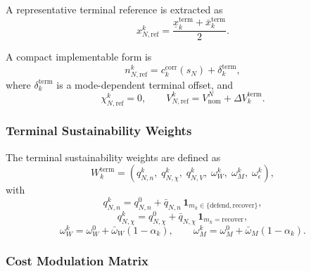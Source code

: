 \documentclass[final ,3p, times]{elsarticle}
\begin{document}
A representative terminal reference is extracted as
\begin{equation}
x_{N,\mathrm{ref}}^k
=
\frac{
\underline x_k^{\mathrm{term}}
+
\bar x_k^{\mathrm{term}}
}{2}.
\label{eq:terminal_reference_center}
\end{equation}

A compact implementable form is
\begin{equation}
n_{N,\mathrm{ref}}^k
=
c_k^{\mathrm{corr}}(s_N)
+
\delta_k^{\mathrm{term}},
\label{eq:terminal_n_reference}
\end{equation}
where $\delta_k^{\mathrm{term}}$ is a mode-dependent terminal offset, and
\begin{equation}
\chi_{N,\mathrm{ref}}^k = 0,
\qquad
V_{N,\mathrm{ref}}^k
=
V_{\mathrm{nom}}^N + \Delta V_k^{\mathrm{term}}.
\label{eq:terminal_chi_v_reference}
\end{equation}

\subsubsection{Terminal Sustainability Weights}

The terminal sustainability weights are defined as
\begin{equation}
W_k^{\mathrm{term}}
=
\left(
q_{N,n}^k,\;
q_{N,\chi}^k,\;
q_{N,V}^k,\;
\omega_{W}^k,\;
\omega_{M}^k,\;
\omega_{\epsilon}^k
\right),
\label{eq:terminal_weight_vector}
\end{equation}
with
\begin{equation}
q_{N,n}^k = q_{N,n}^{0} + \bar q_{N,n}\,\mathbf{1}_{m_k \in \{\mathrm{defend},\mathrm{recover}\}},
\label{eq:terminal_weight_n}
\end{equation}
\begin{equation}
q_{N,\chi}^k = q_{N,\chi}^{0} + \bar q_{N,\chi}\,\mathbf{1}_{m_k=\mathrm{recover}},
\label{eq:terminal_weight_chi}
\end{equation}
\begin{equation}
\omega_{W}^k = \omega_W^0 + \bar\omega_W(1-\alpha_k),
\qquad
\omega_{M}^k = \omega_M^0 + \bar\omega_M(1-\alpha_k).
\label{eq:terminal_weight_corridor}
\end{equation}

\subsubsection{Cost Modulation Matrix}
\end{document}
